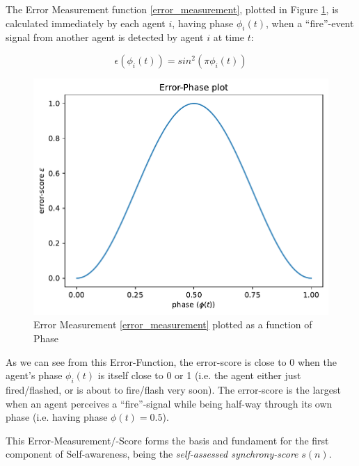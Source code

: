 			
			
			
			The Error Measurement function \eqref{error_measurement}, plotted in Figure \ref{fig:error_measurement}, is calculated immediately by each agent $i$, having phase $\phi_i(t)$, when a ``fire''-event signal from another agent is detected by agent $i$ at time $t$:
			
			\begin{equation}
			\label{error_measurement}
				\epsilon(\phi_i(t)) = sin^2(\pi\phi_i(t))
			\end{equation} \nl
			
			\begin{figure}[h!]
				\centering
				\includegraphics[width=0.8\linewidth]{Assets/Figures/PhaseErrorFunction.pdf}
				\caption{Error Measurement \eqref{error_measurement} plotted as a function of Phase}
				\label{fig:error_measurement}
			\end{figure}
			
			As we can see from this Error-Function, the error-score is close to 0 when the agent's phase $\phi_i(t)$ is itself close to 0 or 1 (i.e. the agent either just fired/flashed, or is about to fire/flash very soon). The error-score is the largest when an agent perceives a ``fire''-signal while being half-way through its own phase (i.e. having phase $\phi(t)=0.5$).
			
			This Error-Measurement/-Score forms the basis and fundament for the first component of Self-awareness, being the \textit{self-assessed synchrony-score} $s(n)$.
			
			
